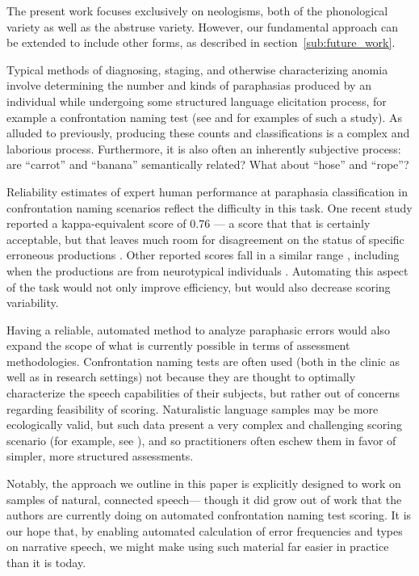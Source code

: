 The present work focuses exclusively on neologisms, both of the phonological variety as well as the abstruse variety. However, our fundamental approach can be extended to include other forms, as described in section~\ref{sub:future_work}.

Typical methods of diagnosing, staging, and otherwise characterizing anomia involve determining the number and kinds of paraphasias produced by an individual while undergoing some structured language elicitation process, for example a confrontation naming test (see \cite{Kendall:2013hm} and \cite{Brookshire:2014fa} for examples of such a study).
As alluded to previously, producing these counts and classifications is a complex and laborious process.
Furthermore, it is also often an inherently subjective process: are ``carrot'' and ``banana'' semantically related?
What about ``hose'' and ``rope''?

Reliability estimates of expert human performance at paraphasia classification in confrontation naming scenarios reflect the difficulty in this task. One recent study reported a kappa-equivalent score of 0.76 --- a score that that is certainly acceptable, but that leaves much room for disagreement on the status of specific erroneous productions \cite{Minkina:2015dz}.
Other reported scores fall in a similar range \cite{doi:10.1080/02687038.2014.973359}, including when the productions are from neurotypical individuals \cite{doi:10.1080/02687038908249023}.
Automating this aspect of the task would not only improve efficiency, but would also decrease scoring variability.

Having a reliable, automated method to analyze paraphasic errors would also expand the scope of what is currently possible in terms of assessment methodologies.
Confrontation naming tests are often used (both in the clinic as well as in research settings) not because they are thought to optimally characterize the speech capabilities of their subjects, but rather out of concerns regarding feasibility of scoring.
Naturalistic language samples may be more ecologically valid, but such data present a very complex and challenging scoring scenario (for example, see \cite{Nicholas:1993wl,Berndt:2000aa,Rochon:2000js}), and so practitioners often eschew them in favor of simpler, more structured assessments.

Notably, the approach we outline in this paper is explicitly designed to work on samples of natural, connected speech--- though it did grow out of work that the authors are currently doing on automated confrontation naming test scoring.
It is our hope that, by enabling automated calculation of  error frequencies and types on narrative speech, we might make using such material far easier in practice than it is today.

